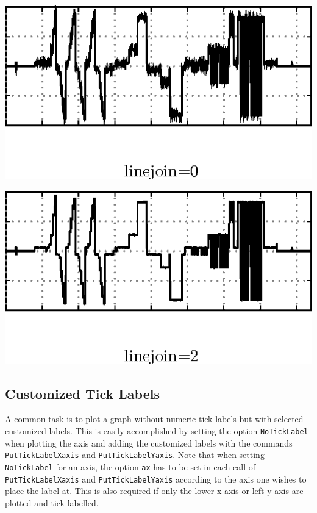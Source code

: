 \begin{minipage}{0.48\linewidth}
	\centering
	\includegraphics{fig_NoiseData_ClosedLine}
\end{minipage}
\begin{minipage}{0.48\linewidth}
	\centering
	\includegraphics{fig_NoiseData_OpenLine}
\end{minipage}



\subsection{Customized Tick Labels}\label{sec:CustomTickLabels}

A common task is to plot a graph without numeric tick labels but with selected customized labels. This is easily accomplished by setting the option \verb|NoTickLabel| when plotting the axis and adding the customized labels with the commands \verb|PutTickLabelXaxis| and \verb|PutTickLabelYaxis|. Note that when setting \verb|NoTickLabel| for an axis, the option \verb|ax| has to be set in each call of \verb|PutTickLabelXaxis| and \verb|PutTickLabelYaxis| according to the axis one wishes to place the label at. This is also required if only the lower x-axis or left y-axis are plotted and tick labelled.

\begin{minipage}[T]{0.5\linewidth}
	
\end{minipage}
\hspace{1ex}
\begin{minipage}[T]{0.4\linewidth}
	
\end{minipage}

